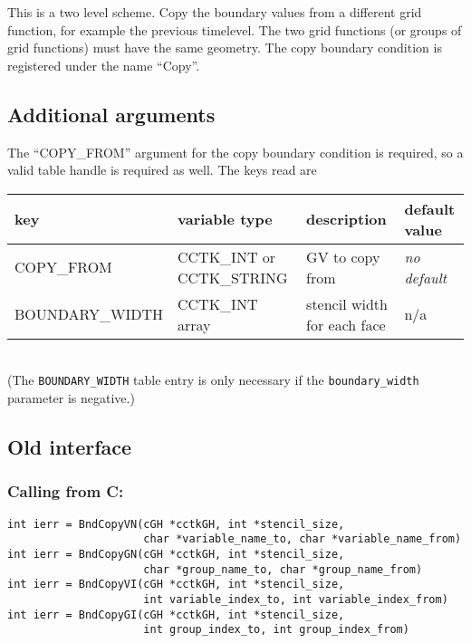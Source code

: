 \documentclass{article}
\begin{document}
This is a two level scheme. Copy the boundary values from a different
grid function, for example the previous timelevel. The two grid
functions (or groups of grid functions) must have the same geometry.
The copy boundary condition is registered under the name ``Copy''.

\subsection{Additional arguments}

The ``COPY\_FROM'' argument for the copy boundary condition is
required, so a valid table handle is required as well.  The keys read are 
\\[1mm]
\begin{tabular}{|l|l|l|l|}
\hline
\textbf{key} & \textbf{variable type} & \textbf{description} & \textbf{default value}\\
\hline
COPY\_FROM & CCTK\_INT or CCTK\_STRING & GV to copy from & \emph{no default}\\
BOUNDARY\_WIDTH & CCTK\_INT array & stencil width for each face & n/a\\
\hline
\end{tabular}
\\[1mm]
(The \texttt{BOUNDARY\_WIDTH} table entry is only necessary if
the \texttt{boundary\_width} parameter is negative.)


\subsection{Old interface}

\subsubsection*{Calling from C:}
\begin{verbatim}
int ierr = BndCopyVN(cGH *cctkGH, int *stencil_size, 
                     char *variable_name_to, char *variable_name_from)
int ierr = BndCopyGN(cGH *cctkGH, int *stencil_size, 
                     char *group_name_to, char *group_name_from)
int ierr = BndCopyVI(cGH *cctkGH, int *stencil_size, 
                     int variable_index_to, int variable_index_from)
int ierr = BndCopyGI(cGH *cctkGH, int *stencil_size, 
                     int group_index_to, int group_index_from)
\end{verbatim}
\end{document}
